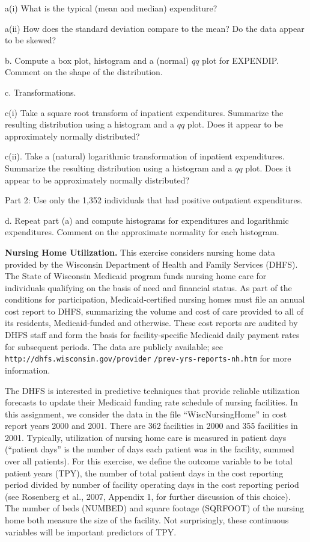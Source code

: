 \begin{exercises}
a(i) What is the typical (mean and median) expenditure?

a(ii) How does the standard deviation compare to the mean? Do the
data appear to be skewed?

b. Compute a box plot, histogram and a (normal) $qq$ plot for
EXPENDIP. Comment on the shape of the distribution.

c. Transformations.

c(i) Take a square root transform of inpatient expenditures.
Summarize the resulting distribution using a histogram and a $qq$
plot. Does it appear to be approximately normally distributed?

c(ii). Take a (natural) logarithmic transformation of inpatient
expenditures. Summarize the resulting distribution using a histogram
and a $qq$ plot. Does it appear to be approximately normally
distributed?

Part 2: Use only the 1,352 individuals that had positive outpatient
expenditures.

d. Repeat part (a) and compute histograms for expenditures and
logarithmic expenditures. Comment on the approximate normality for
each histogram.


\item \textbf{Nursing Home Utilization.}\label{Ex:NursHome}
This exercise considers nursing home data provided by the Wisconsin
Department of Health and Family Services (DHFS). The State of
Wisconsin Medicaid program funds nursing home care for individuals
qualifying on the basis of need and financial status. As part of the
conditions for participation, Medicaid-certified nursing homes must
file an annual cost report to DHFS, summarizing the volume and cost
of care provided to all of its residents, Medicaid-funded and
otherwise. These cost reports are audited by DHFS staff and form the
basis for facility-specific Medicaid daily payment rates for
subsequent periods. The data are publicly available; see
\texttt{http://dhfs.wisconsin.gov/provider}
\texttt{/prev-yrs-reports-nh.htm} for more information.

The DHFS is interested in predictive techniques that provide
reliable utilization forecasts to update their Medicaid funding rate
schedule of nursing facilities. In this assignment, we consider the
data in the file ``WiscNursingHome'' in cost report years 2000 and
2001. There are 362 facilities in 2000 and 355 facilities in 2001.
Typically, utilization of nursing home care is measured in patient
days (``patient days'' is the number of days each patient was in the
facility, summed over all patients). For this exercise, we define
the outcome variable to be total patient years (TPY), the number of
total patient days in the cost reporting period divided by number of
facility operating days in the cost reporting period (see Rosenberg
et al., 2007, Appendix 1, for further discussion of this choice).
The number of beds (NUMBED) and square footage (SQRFOOT) of the
nursing home both measure the size of the facility. Not
surprisingly, these continuous variables will be important
predictors of TPY.


\end{exercises}
